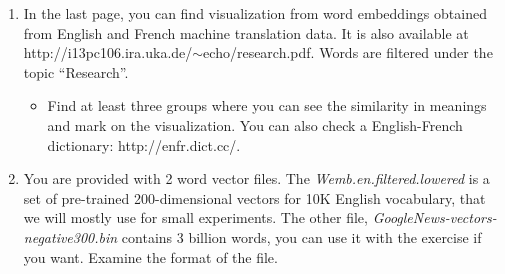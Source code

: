 \documentclass[12pt,fleqn]{article}
\begin{document}
\begin{enumerate}



\item In the last page, you can find visualization from word embeddings obtained from English and French machine translation data. It is also available at http://i13pc106.ira.uka.de/$\sim$echo/research.pdf. 
Words are filtered under the topic ``Research''. \\ 

\begin{itemize} 
 \item Find at least three groups where you can see the similarity in meanings and mark on the visualization. You can also check a English-French dictionary: http://enfr.dict.cc/. 
\end{itemize}

% 
% 



\item You are provided with 2 word vector files. The \textit{Wemb.en.filtered.lowered} is a set of pre-trained 200-dimensional vectors for 10K English vocabulary, that we will mostly use for small experiments. The other file, \textit{GoogleNews-vectors-negative300.bin} contains 3 billion words, you can use it with the exercise if you want. 
Examine the format of the file.  


\end{enumerate}
\end{document}
